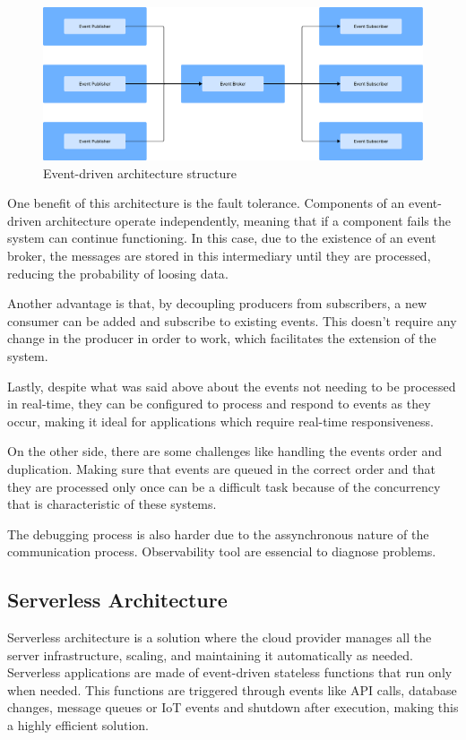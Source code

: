 \begin{figure}[htbp]
	\centering
	\includegraphics[width=\textwidth, height=0.5\textheight, keepaspectratio]{Chapters/Figures/Architectures/Event-driven.pdf}
	\caption{Event-driven architecture structure}
	\label{fig:architectures:event-driven}
\end{figure}

One benefit of this architecture is the fault tolerance.
Components of an event-driven architecture operate independently, meaning
that if a component fails the system can continue functioning. In this
case, due to the existence of an event broker, the messages are stored in
this intermediary until they are processed, reducing the probability of
loosing data\cite{AWSEventDriven}.

Another advantage is that, by decoupling producers from subscribers, a new
consumer can be added and subscribe to existing events. This doesn't require
any change in the producer in order to work, which facilitates the extension of
the system\cite{MicrosoftEventDriven}.

Lastly, despite what was said above about the events not needing to be processed
in real-time, they can be configured to process and respond to events
as they occur, making it ideal for applications which require real-time
responsiveness\cite{manchana2021event}.

On the other side, there are some challenges like handling the events order and
duplication.
Making sure that events are queued in the correct order and that they are
processed only once can be a difficult task because of the concurrency
that is characteristic of these systems\cite{MicrosoftEventDriven}.

The debugging process is also harder due to the assynchronous nature of the
communication process.
Observability tool are essencial to diagnose problems\cite{manchana2021event}.

\subsection{Serverless Architecture}
Serverless architecture is a solution where the cloud provider manages all the
server infrastructure, scaling, and maintaining it automatically as needed.
Serverless applications are made of event-driven stateless functions that run
only when needed\cite{marcelino2024goldfish}. This functions are triggered
through events like \gls{API} calls, database changes, message queues or
\gls{IoT} events and shutdown after execution, making this a highly efficient
solution\cite{s21030928}.

